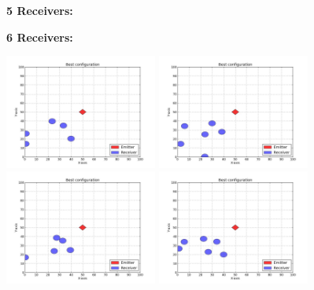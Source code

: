 \documentclass[10pt,a4paper]{book}
\begin{document}
\begin{figure}[H]
\centering
\begin{minipage}{50mm}
\textbf{5 Receivers:}
\end{minipage}%
\begin{minipage}{50mm}
\textbf{6 Receivers:}
\end{minipage}
\begin{minipage}{50mm}
  \centering
  \includegraphics[width=50mm]{Problem2NoRotateRecv5_1.jpg}
\end{minipage}%
\begin{minipage}{50mm}
  \centering
  \includegraphics[width=50mm]{Problem2NoRotateRecv6_1.jpg}
\end{minipage}
\begin{minipage}{50mm}
  \centering
  \includegraphics[width=50mm]{Problem2NoRotateRecv5_2.jpg}
\end{minipage}
\begin{minipage}{50mm}
  \centering
  \includegraphics[width=50mm]{Problem2NoRotateRecv6_2.jpg}

\end{minipage}
\end{figure}
\end{document}
